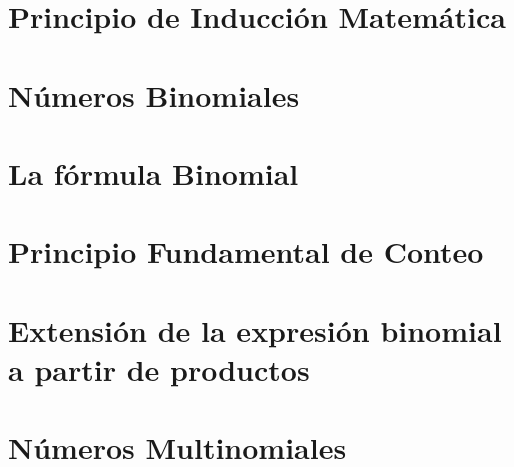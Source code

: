 \section{Principio de Inducci\'{o}n Matem\'{a}tica}

\section{N\'{u}meros Binomiales}

\section{La f\'{o}rmula Binomial}

\section{Principio Fundamental de Conteo}

\section{Extensi\'{o}n de la expresi\'{o}n binomial a partir de productos}

\section{N\'{u}meros Multinomiales}
